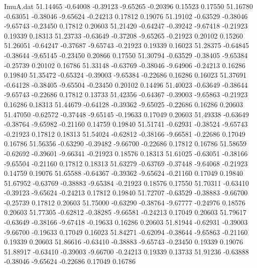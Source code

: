 \begin{filecontents}{ImuA.dat}
  51.14465   -0.64008   -0.39123   -9.65265   -0.20396    0.15523    0.17550
  51.16780   -0.63051   -0.38046   -9.65624   -0.24213    0.17812    0.19076
  51.19102   -0.63529   -0.38046   -9.65743   -0.23450    0.17812    0.20603
  51.21420   -0.64247   -0.39242   -9.67418   -0.21923    0.19339    0.18313
  51.23733   -0.63649   -0.37208   -9.65265   -0.21923    0.20102    0.15260
  51.26051   -0.64247   -0.37687   -9.65743   -0.21923    0.19339    0.16023
  51.28375   -0.64845   -0.38644   -9.65145   -0.23450    0.20866    0.17550
  51.30794   -0.63529   -0.38405   -9.65384   -0.25739    0.20102    0.16786
  51.33148   -0.63769   -0.38046   -9.64906   -0.24213    0.16286    0.19840
  51.35472   -0.65324   -0.39003   -9.65384   -0.22686    0.16286    0.16023
  51.37691   -0.64128   -0.38405   -9.65504   -0.23450    0.20102    0.14496
  51.40023   -0.63649   -0.38644   -9.65743   -0.22686    0.17812    0.13733
  51.42356   -0.64367   -0.39003   -9.65863   -0.21923    0.16286    0.18313
  51.44679   -0.64128   -0.39362   -9.65025   -0.22686    0.16286    0.20603
  51.47050   -0.62572   -0.37448   -9.65145   -0.19633    0.17049    0.20603
  51.49338   -0.63649   -0.38764   -9.65982   -0.21160    0.14759    0.19840
  51.51741   -0.62931   -0.38524   -9.65743   -0.21923    0.17812    0.18313
  51.54024   -0.62812   -0.38166   -9.66581   -0.22686    0.17049    0.16786
  51.56356   -0.63290   -0.39482   -9.66700   -0.22686    0.17812    0.16786
  51.58659   -0.62692   -0.39601   -9.66341   -0.21923    0.18576    0.18313
  51.61025   -0.63051   -0.38166   -9.65504   -0.21160    0.17812    0.18313
  51.63279   -0.63769   -0.37448   -9.64068   -0.21923    0.14759    0.19076
  51.65588   -0.64367   -0.39362   -9.65624   -0.21160    0.17049    0.19840
  51.67952   -0.63769   -0.38883   -9.65384   -0.21923    0.18576    0.17550
  51.70311   -0.63410   -0.39123   -9.65624   -0.24213    0.17812    0.19840
  51.72707   -0.63529   -0.38883   -9.66700   -0.25739    0.17812    0.20603
  51.75000   -0.63290   -0.38764   -9.67777   -0.24976    0.18576    0.20603
  51.77305   -0.62812   -0.38285   -9.66581   -0.24213    0.17049    0.20603
  51.79617   -0.63649   -0.38166   -9.67418   -0.19633    0.16286    0.20603
  51.81944   -0.62931   -0.39003   -9.66700   -0.19633    0.17049    0.16023
  51.84271   -0.62094   -0.38644   -9.65863   -0.21160    0.19339    0.20603
  51.86616   -0.63410   -0.38883   -9.65743   -0.23450    0.19339    0.19076
  51.88917   -0.63410   -0.39003   -9.66700   -0.24213    0.19339    0.13733
  51.91236   -0.63888   -0.38046   -9.65624   -0.22686    0.17049    0.16786

\end{filecontents}
